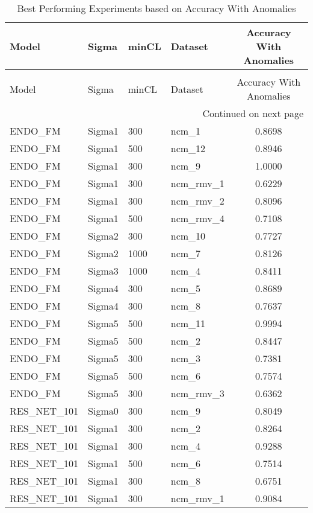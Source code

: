 \begin{longtable}{|l|l|l|l|c|}
\caption{Best Performing Experiments based on Accuracy With Anomalies} \label{tab:best-accuracy-with-anomalies} \\
\toprule
Model & Sigma & minCL & Dataset & Accuracy With Anomalies \\
\midrule
\endfirsthead
\caption[]{Best Performing Experiments based on Accuracy With Anomalies} \\
\toprule
Model & Sigma & minCL & Dataset & Accuracy With Anomalies \\
\midrule
\endhead
\midrule
\multicolumn{5}{r}{Continued on next page} \\
\midrule
\endfoot
\bottomrule
\endlastfoot
ENDO\_FM & Sigma1 & 300 & ncm\_1 & 0.8698 \\
ENDO\_FM & Sigma1 & 500 & ncm\_12 & 0.8946 \\
ENDO\_FM & Sigma1 & 300 & ncm\_9 & 1.0000 \\
ENDO\_FM & Sigma1 & 300 & ncm\_rmv\_1 & 0.6229 \\
ENDO\_FM & Sigma1 & 300 & ncm\_rmv\_2 & 0.8096 \\
ENDO\_FM & Sigma1 & 500 & ncm\_rmv\_4 & 0.7108 \\
ENDO\_FM & Sigma2 & 300 & ncm\_10 & 0.7727 \\
ENDO\_FM & Sigma2 & 1000 & ncm\_7 & 0.8126 \\
ENDO\_FM & Sigma3 & 1000 & ncm\_4 & 0.8411 \\
ENDO\_FM & Sigma4 & 300 & ncm\_5 & 0.8689 \\
ENDO\_FM & Sigma4 & 300 & ncm\_8 & 0.7637 \\
ENDO\_FM & Sigma5 & 500 & ncm\_11 & 0.9994 \\
ENDO\_FM & Sigma5 & 500 & ncm\_2 & 0.8447 \\
ENDO\_FM & Sigma5 & 300 & ncm\_3 & 0.7381 \\
ENDO\_FM & Sigma5 & 500 & ncm\_6 & 0.7574 \\
ENDO\_FM & Sigma5 & 300 & ncm\_rmv\_3 & 0.6362 \\
RES\_NET\_101 & Sigma0 & 300 & ncm\_9 & 0.8049 \\
RES\_NET\_101 & Sigma1 & 300 & ncm\_2 & 0.8264 \\
RES\_NET\_101 & Sigma1 & 300 & ncm\_4 & 0.9288 \\
RES\_NET\_101 & Sigma1 & 500 & ncm\_6 & 0.7514 \\
RES\_NET\_101 & Sigma1 & 300 & ncm\_8 & 0.6751 \\
RES\_NET\_101 & Sigma1 & 300 & ncm\_rmv\_1 & 0.9084 \\

\end{longtable}
